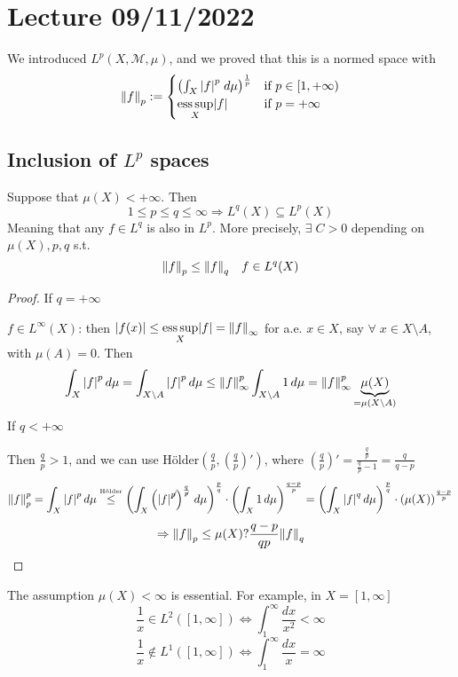 \section{Lecture 09/11/2022}
We introduced \(L^p(X, \mathcal{M}, \mu)\), and we proved that this is a normed space with 
\[
    \norm{f}_p := \begin{cases}
        \left( \int_X \abs{f}^p \; d\mu \right)^{\frac{1}{p}} & \text{if } p\in [1, +\infty) \\
        \underset{X}{\text{ess}\, \text{sup}}\abs{f} & \text{if } p = +\infty
    \end{cases}
\]
\subsection*{Inclusion of \(L^p\) spaces}
\begin{theorem}
    Suppose that \(\mu(X) < +\infty\). Then 
    \[
        1 \leq p \leq q \leq \infty \Rightarrow L^q(X) \subseteq L^p(X)
    \]
    Meaning that any \(f \in L^q\) is also in \(L^p\). More precisely, \(\exists \; C > 0\) depending on \(\mu(X), p, q\) s.t.
    \[
        \norm{f}_p \leq \norm{f}_q \quad f \in L^q(X)
    \]
\end{theorem}
\begin{proof}
    If \(q = +\infty\)
    
    \(f \in L^\infty(X)\): then \(\abs{f(x)} \leq \underset{X}{\text{ess}\, \text{sup}}\abs{f} = \norm{f}_\infty\) for a.e. \(x \in X\), say \(\forall \; x \in X \setminus A\), with \(\mu(A) = 0\). Then 
    \[
        \int_X \abs{f}^p \, d\mu = \int_{X\setminus A} \abs{f}^p \, d\mu \leq \norm{f}_{\infty}^p \int_{X\setminus A} 1 \,d\mu = \norm{f}_\infty^p \underbrace{\mu(X)}_{= \mu(X\setminus A)}
    \]
    If \(q < +\infty\)

    Then \(\frac{q}{p} > 1\), and we can use Hölder\(\left(\frac{q}{p},\left( \frac{q}{p} \right)' \right)\), where \(\left( \frac{q}{p} \right)' = \frac{\frac{q}{p}}{\frac{q}{p}-1} = \frac{q}{q-p}\)
    \[
        \norm{f}_p^p = \int_X \abs{f}^p \, d\mu \overset{\text{\tiny{Hölder}}}{\leq} \left( \int_X \left( \abs{f}^{\not p} \right)^{\frac{q}{\not p}} \, d\mu\right)^{\frac{p}{q}}\cdot \left( \int_X 1 \, d\mu \right)^{\frac{q-p}{p}} = \left( \int_X \abs{f}^{q} \, d\mu\right)^{\frac{p}{q}}\cdot \left( \mu(X)\right)^{\frac{q-p}{p}}
    \]
    \[
        \Rightarrow \norm{f}_p \leq \mu(X)?{\frac{q-p}{qp}} \norm{f}_q
    \]
\end{proof}

The assumption \(\mu(X)< \infty\) is essential. For example, in \(X = [1, \infty]\)
\[
    \frac{1}{x} \in L^2([1, \infty]) \Leftrightarrow \int_1^\infty \frac{dx}{x^2} < \infty
\]
\[
    \frac{1}{x} \notin L^1 ([1, \infty]) \Leftrightarrow \int_1^\infty \frac{dx}{x} = \infty
\]

